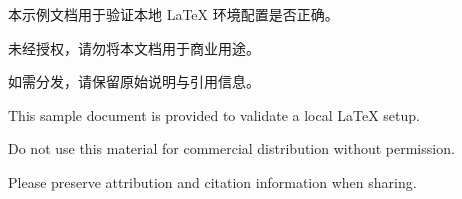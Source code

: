 \thispagestyle{empty}
\par
\vspace{1em}
本示例文档用于验证本地 \LaTeX{} 环境配置是否正确。\par
未经授权，请勿将本文档用于商业用途。\par
如需分发，请保留原始说明与引用信息。\par
\vfill
{}\par
\vspace{1em}
This sample document is provided to validate a local \LaTeX{} setup.\par
Do not use this material for commercial distribution without permission.\par
Please preserve attribution and citation information when sharing.\par
\clearpage
